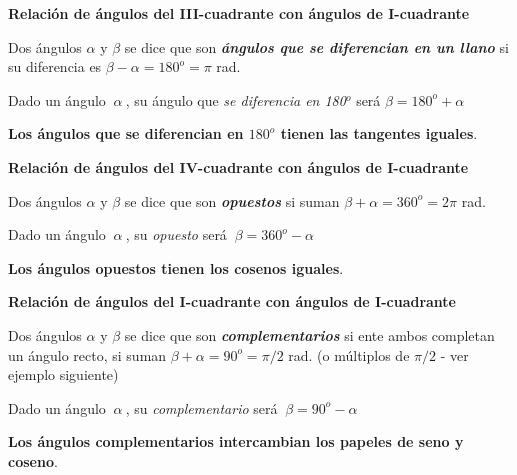 \vspace{0.2cm}
\begin{large}\textbf{Relación de ángulos del  III-cuadrante con ángulos de I-cuadrante}\end{large}

\vspace{2mm}
\begin{theorem}

Dos ángulos $\alpha$ y $\beta$	se dice que son \emph{\textbf{ángulos que se diferencian en un llano}} si su diferencia es  $\beta-\alpha=180^o = \pi $ rad.

\vspace{2mm} Dado un ángulo $\ \alpha\ $, su ángulo que \emph{se diferencia en 180$^o$} será $\beta=180^o+\alpha$

\vspace{2mm}\textbf{Los ángulos que se diferencian en $180^o$ tienen las tangentes iguales}.
\end{theorem}

\vspace{0.2cm}
\begin{large}\textbf{Relación de ángulos del  IV-cuadrante con ángulos de I-cuadrante}\end{large}

\vspace{2mm}
\begin{theorem}

Dos ángulos $\alpha$ y $\beta$	se dice que son \emph{\textbf{opuestos}} si suman $\beta+\alpha=360^o = 2\pi $ rad.

\vspace{2mm} Dado un ángulo $\ \alpha\ $, su \emph{opuesto} será $\ \beta= 360^o-\alpha$

\vspace{2mm}\textbf{Los ángulos opuestos tienen los cosenos iguales}.
\end{theorem}


\vspace{0.2cm}
\begin{large}\textbf{Relación de ángulos del  I-cuadrante con ángulos de I-cuadrante}\end{large}

\vspace{2mm}
\begin{theorem}

Dos ángulos $\alpha$ y $\beta$	se dice que son \emph{\textbf{complementarios}} si ente ambos completan un ángulo recto, si suman  $\beta+\alpha=90^o = \pi/2 $ rad. (o múltiplos de $\pi/2$ - ver ejemplo siguiente)

\vspace{2mm} Dado un ángulo $\ \alpha\ $, su \emph{complementario} será $\ \beta= 90^o-\alpha$

\vspace{2mm}\textbf{Los ángulos complementarios intercambian los papeles de seno y coseno}.
\end{theorem}

